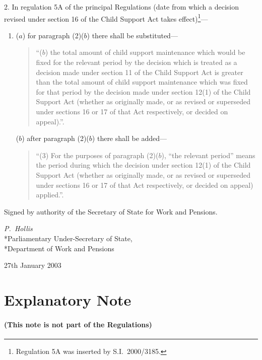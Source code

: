 \documentclass[12pt,a4paper]{article}
\begin{document}
2.  In regulation 5A of the principal Regulations (date from which a decision revised under section 16 of the Child Support Act takes effect)\footnote{Regulation 5A was inserted by S.I.\ 2000/3185.}—
\begin{enumerate}\item[]
($a$) for paragraph (2)($b$)  there shall be substituted—
\begin{quotation}
“($b$) the total amount of child support maintenance which would be fixed for the relevant period by the decision which is treated as a decision made under section 11 of the Child Support Act is greater than the total amount of child support maintenance which was fixed for that period by the decision made under section 12(1) of the Child Support Act (whether as originally made, or as revised or superseded under sections 16 or 17 of that Act respectively, or decided on appeal).”.
\end{quotation}

($b$) after paragraph (2)($b$)  there shall be added—
\begin{quotation}
“(3) For the purposes of paragraph (2)($b$), “the relevant period” means the period during which the decision under section 12(1) of the Child Support Act (whether as originally made, or as revised or superseded under sections 16 or 17 of that Act respectively, or decided on appeal) applied.”.
\end{quotation}
\end{enumerate}

\bigskip

Signed 
by authority of the Secretary of State for Work and Pensions.

{\raggedleft
\emph{P.~Hollis}\\*Parliamentary Under-Secretary of State,\\*Department of Work and Pensions

}


27th January 2003

\small

\part{Explanatory Note}

\renewcommand\parthead{— Explanatory Note}

\subsection*{(This note is not part of the Regulations)}
\end{document}
